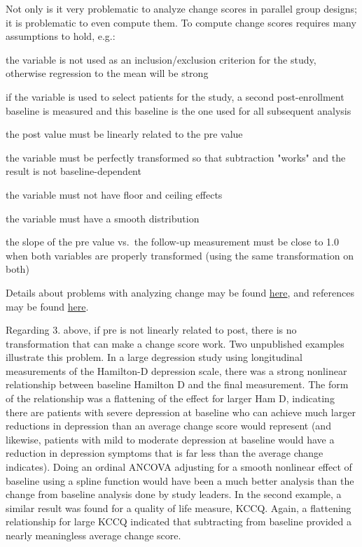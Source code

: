 Not only is it very problematic to analyze change scores in parallel group designs; it is problematic to even compute them.  To compute change scores requires many assumptions to hold, e.g.:
\be
\item the variable is not used as an inclusion/exclusion criterion for the study, otherwise regression to the mean will be strong
\item if the variable is used to select patients for the study, a second post-enrollment baseline is measured and this baseline is the one used for all subsequent analysis
\item the post value must be linearly related to the pre value
\item the variable must be perfectly transformed so that subtraction "works" and the result is not baseline-dependent
\item the variable must not have floor and ceiling effects
\item the variable must have a smooth distribution
\item the slope of the pre value vs.\ the follow-up measurement must be close to 1.0 when both variables are properly transformed (using the same transformation on both)
\ee

Details about problems with analyzing change may be found \href{http://biostat.mc.vanderbilt.edu/MeasureChange}{here}, and references may be found \href{http://www.citeulike.org/user/harrelfe/tag/change}{here}.

Regarding 3. above, if pre is not linearly related to post, there is no transformation that can make a change score work.  Two unpublished examples illustrate this problem.  In a large degression study using longitudinal measurements of the Hamilton-D depression scale, there was a strong nonlinear relationship between baseline Hamilton D and the final measurement.  The form of the relationship was a flattening of the effect for larger Ham D, indicating there are patients with severe depression at baseline who can achieve much larger reductions in depression than an average change score would represent (and likewise, patients with mild to moderate depression at baseline would have a reduction in depression symptoms that is far less than the average change indicates).  Doing an ordinal ANCOVA adjusting for a smooth nonlinear effect of baseline using a spline function would have been a much better analysis than the change from baseline analysis done by study leaders.  In the second example, a similar result was found for a quality of life measure, KCCQ.  Again, a flattening relationship for large KCCQ indicated that subtracting from baseline provided a nearly meaningless average change score.

